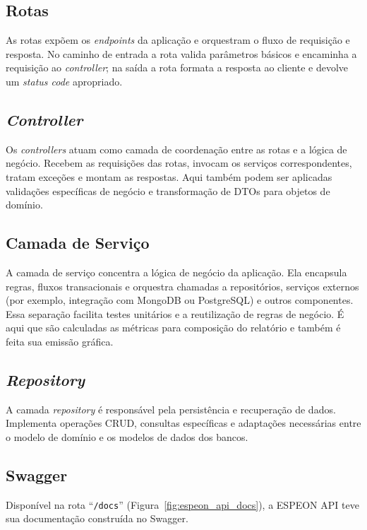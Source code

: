 \subsection{Rotas}\label{espeon_api_routes}
As rotas expõem os \textit{endpoints} da aplicação e orquestram o fluxo de requisição e resposta. No caminho de entrada a rota valida parâmetros básicos e encaminha a requisição ao \textit{controller}; na saída a rota formata a resposta ao cliente e devolve um \textit{status code} apropriado.

\subsection{\textit{Controller}}\label{espeon_api_controller}
Os \textit{controllers} atuam como camada de coordenação entre as rotas e a lógica de negócio. Recebem as requisições das rotas, invocam os serviços correspondentes, tratam exceções e montam as respostas. Aqui também podem ser aplicadas validações específicas de negócio e transformação de DTOs para objetos de domínio.

\subsection{Camada de Serviço}\label{espeon_api_service}
A camada de serviço concentra a lógica de negócio da aplicação. Ela encapsula regras, fluxos transacionais e orquestra chamadas a repositórios, serviços externos (por exemplo, integração com MongoDB ou PostgreSQL) e outros componentes. Essa separação facilita testes unitários e a reutilização de regras de negócio. É aqui que são calculadas as métricas para composição do relatório e também é feita sua emissão gráfica.

\subsection{\textit{Repository}}\label{espeon_api_repository}
A camada \textit{repository} é responsável pela persistência e recuperação de dados. Implementa operações CRUD, consultas específicas e adaptações necessárias entre o modelo de domínio e os modelos de dados dos bancos. 

\subsection{Swagger}\label{espeon_api_swagger}
Disponível na rota ``\texttt{/docs}'' (Figura~\ref{fig:espeon_api_docs}), a ESPEON API teve sua documentação construída no Swagger.

